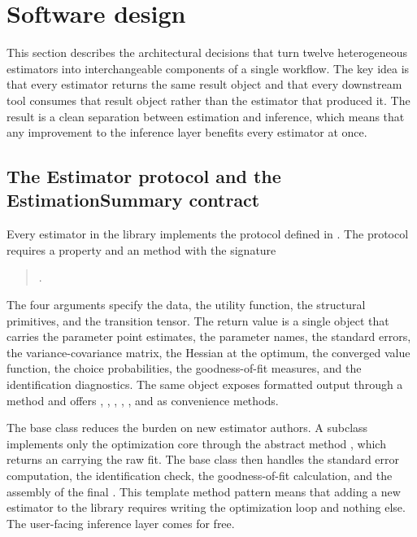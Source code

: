 \section{Software design} \label{sec:design}

This section describes the architectural decisions that turn twelve heterogeneous estimators into interchangeable components of a single workflow. The key idea is that every estimator returns the same result object and that every downstream tool consumes that result object rather than the estimator that produced it. The result is a clean separation between estimation and inference, which means that any improvement to the inference layer benefits every estimator at once.

\subsection{The Estimator protocol and the EstimationSummary contract}

Every estimator in the library implements the  protocol defined in . The protocol requires a  property and an  method with the signature
\begin{quote}
.
\end{quote}
The four arguments specify the data, the utility function, the structural primitives, and the transition tensor. The return value is a single object that carries the parameter point estimates, the parameter names, the standard errors, the variance-covariance matrix, the Hessian at the optimum, the converged value function, the choice probabilities, the goodness-of-fit measures, and the identification diagnostics. The same object exposes formatted output through a  method and offers , , , , , and  as convenience methods.

The base class  reduces the burden on new estimator authors. A subclass implements only the optimization core through the abstract method , which returns an  carrying the raw fit. The base class then handles the standard error computation, the identification check, the goodness-of-fit calculation, and the assembly of the final . This template method pattern means that adding a new estimator to the library requires writing the optimization loop and nothing else. The user-facing inference layer comes for free.

